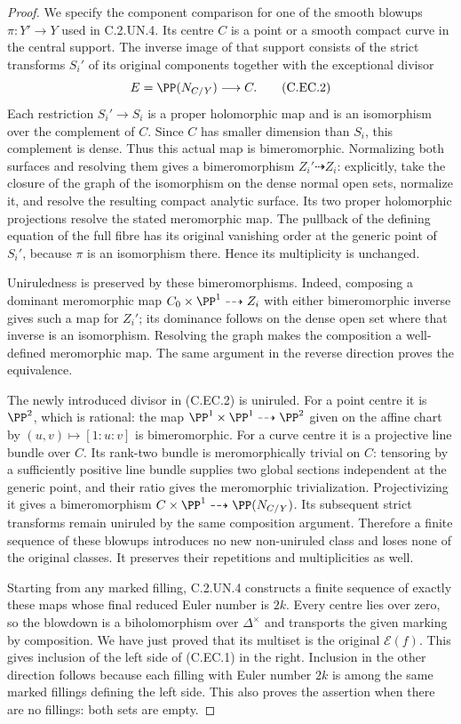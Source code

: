 \begin{proof}
We specify the component comparison for one of the smooth blowups
$\pi:Y'\to Y$ used in C.2.UN.4. Its centre $C$ is a point or a
smooth compact curve in the central support. The inverse image of
that support consists of the strict transforms $S_i'$ of its
original components together with the exceptional divisor
\[
 E=\PP(N_{C/Y})\longrightarrow C.                    \tag{C.EC.2}
\]
Each restriction $S_i'\to S_i$ is a proper holomorphic map and is an
isomorphism over the complement of $C$. Since $C$ has smaller
dimension than $S_i$, this complement is dense. Thus this actual
map is bimeromorphic. Normalizing both surfaces and resolving them
gives a bimeromorphism $Z_i'\dashrightarrow Z_i$: explicitly, take
the closure of the graph of the isomorphism on the dense normal
open sets, normalize it, and resolve the resulting compact analytic
surface. Its two proper holomorphic projections resolve the stated
meromorphic map. The pullback of the defining equation of the full
fibre has its original vanishing order at the generic point of
$S_i'$, because $\pi$ is an isomorphism there. Hence its
multiplicity is unchanged.

Uniruledness is preserved by these bimeromorphisms. Indeed, composing
a dominant meromorphic map $C_0\times\PP^1\dashrightarrow Z_i$
with either bimeromorphic inverse gives such a map for $Z_i'$; its
dominance follows on the dense open set where that inverse is an
isomorphism. Resolving the graph makes the composition a
well-defined meromorphic map. The same argument in the reverse
direction proves the equivalence.

The newly introduced divisor in (C.EC.2) is uniruled. For a point
centre it is $\PP^2$, which is rational: the map
$\PP^1\times\PP^1\dashrightarrow\PP^2$ given on the affine chart
by $(u,v)\mapsto[1:u:v]$ is bimeromorphic. For a curve centre it is
a projective line bundle over $C$. Its rank-two bundle is
meromorphically trivial on $C$: tensoring by a sufficiently positive
line bundle supplies two global sections independent at the
generic point, and their ratio gives the meromorphic
trivialization. Projectivizing it gives a bimeromorphism
$C\times\PP^1\dashrightarrow\PP(N_{C/Y})$.
Its subsequent strict transforms remain uniruled by the same
composition argument. Therefore a finite sequence of these blowups
introduces no new non-uniruled class and loses none of the original
classes. It preserves their repetitions and multiplicities as well.

Starting from any marked filling, C.2.UN.4 constructs a finite
sequence of exactly these maps whose final reduced Euler number is
$2k$. Every centre lies over zero, so the blowdown is a
biholomorphism over $\Delta^\times$ and transports the given marking
by composition. We have just proved that its multiset is the
original $\mathcal E(f)$. This gives inclusion of the left side of
(C.EC.1) in the right. Inclusion in the other direction follows
because each filling with Euler number $2k$ is among the same
marked fillings defining the left side. This also proves the
assertion when there are no fillings: both sets are empty.


\end{proof}
